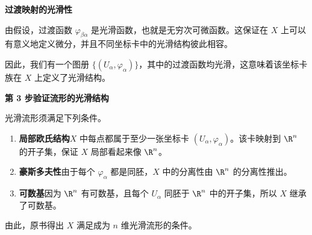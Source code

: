 \textbf{过渡映射的光滑性}\par
由假设，过渡函数 $\varphi_{\beta\alpha}$ 是光滑函数，也就是无穷次可微函数。这保证在 $X$ 上可以有意义地定义微分，并且不同坐标卡中的光滑结构彼此相容。

因此，我们有一个图册 $\{(U_\alpha,\varphi_\alpha)\}$，其中的过渡函数均光滑，这意味着该坐标卡族在 $X$ 上定义了光滑结构。

\textbf{第 3 步\quad 验证流形的光滑结构}\par
光滑流形须满足下列条件。
\begin{enumerate}
  \item \textbf{局部欧氏结构}\quad $X$ 中每点都属于至少一张坐标卡 $(U_\alpha,\varphi_\alpha)$。该卡映射到 $\R^n$ 的开子集，保证 $X$ 局部看起来像 $\R^n$。
  \item \textbf{豪斯多夫性}\quad 由于每个 $\varphi_\alpha$ 都是同胚，$X$ 中的分离性由 $\R^n$ 的分离性推出。
  \item \textbf{可数基}\quad 因为 $\R^n$ 有可数基，且每个 $U_\alpha$ 同胚于 $\R^n$ 中的开子集，所以 $X$ 继承了可数基。
\end{enumerate}
由此，原书得出 $X$ 满足成为 $n$ 维光滑流形的条件。
